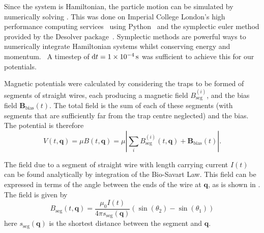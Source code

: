 
Since the system is Hamiltonian, the particle motion can be simulated by
numerically solving . This was done on Imperial
College London's high performance computing services~\cite{ICRCS} using
Python~\cite{python} and the symplectic euler method provided by the Desolver
package~\cite{desolver}. Symplectic methods are powerful ways to numerically
integrate Hamiltonian systems whilst conserving energy and
momentum.~\cite{Hairer2015, doi:10.1119/1.2034523} A timestep of $\dd t =
\SI{1E-4}{\second}$ was sufficient to achieve this for our potentials.

Magnetic potentials were calculated by considering the traps to be formed of
segments of straight wires, each producing a magnetic field
$B_\text{seg}^{(i)}$, and the bias field $\mathbf{B}_\text{bias}(t)$. The total
field is the sum of each of these segments (with segments that are sufficiently
far from the trap centre neglected) and the bias. The potential is therefore
%
\begin{equation} V(t, \mathbf{q}) = \mu B (t, \mathbf{q}) = \mu \left| \sum_i
B_\text{seg}^{(i)}(t, \mathbf{q}) + \mathbf{B}_\text{bias}(t)\right|.
\end{equation}

The field due to a segment of straight wire with length carrying current $I(t)$
can be found analytically by integration of the Bio-Savart Law.
This field can be expressed in terms of the angle between the ends of the wire
at $\mathbf{q}$, as is shown in . The field
is given by~\cite{Griffiths2017}
%
\begin{equation}
  B_\text{seg}(t, \mathbf{q}) = \frac{\mu_0 I(t)}{4\pi
  s_\text{seg}(\mathbf{q})} (\sin(\theta_2)  - \sin(\theta_1))
\label{design:eq:segmentfield}
\end{equation}
here $s_\text{seg}(\mathbf{q})$ is the shortest distance between the segment
and $\mathbf{q}$.


